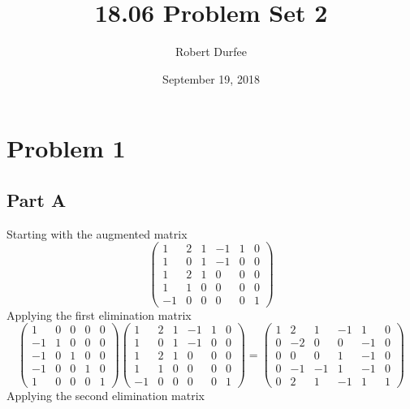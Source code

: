 \documentclass{article}
\title{18.06 Problem Set 2}
\author{Robert Durfee}
\date{September 19, 2018}
\begin{document}
\maketitle

\section*{Problem 1}

\subsection*{Part A}

Starting with the augmented matrix
\[
    \begin{pmatrix}
        1 & 2 & 1 & -1 & 1 & 0 \\
        1 & 0 & 1 & -1 & 0 & 0 \\
        1 & 2 & 1 & 0 & 0 & 0 \\
        1 & 1 & 0 & 0 & 0 & 0 \\
        -1 & 0 & 0 & 0 & 0 & 1
    \end{pmatrix}
\]
Applying the first elimination matrix
\[
    \begin{pmatrix}
        1 & 0 & 0 & 0 & 0 \\
        -1 & 1 & 0 & 0 & 0 \\
        -1 & 0 & 1 & 0 & 0 \\
        -1 & 0 & 0 & 1 & 0 \\
        1 & 0 & 0 & 0 & 1
    \end{pmatrix}
    \begin{pmatrix}
        1 & 2 & 1 & -1 & 1 & 0 \\
        1 & 0 & 1 & -1 & 0 & 0 \\
        1 & 2 & 1 & 0 & 0 & 0 \\
        1 & 1 & 0 & 0 & 0 & 0 \\
        -1 & 0 & 0 & 0 & 0 & 1
    \end{pmatrix}
    =
    \begin{pmatrix}
        1 & 2 & 1 & -1 & 1 & 0 \\
        0 & -2 & 0 & 0 & -1 & 0 \\
        0 & 0 & 0 & 1 & -1 & 0 \\
        0 & -1 & -1 & 1 & -1 & 0 \\
        0 & 2 & 1 & -1 & 1 & 1
    \end{pmatrix}
\]
Applying the second elimination matrix
\end{document}
